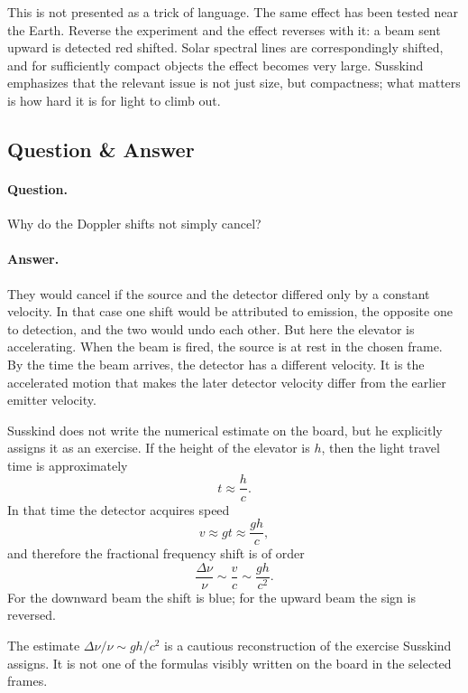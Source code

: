 This is not presented as a trick of language. The same effect has been tested near the Earth. Reverse the experiment and the effect reverses with it: a beam sent upward is detected red shifted. Solar spectral lines are correspondingly shifted, and for sufficiently compact objects the effect becomes very large. Susskind emphasizes that the relevant issue is not just size, but compactness; what matters is how hard it is for light to climb out.

\subsection{Question \& Answer}

\paragraph{Question.} Why do the Doppler shifts not simply cancel?

\paragraph{Answer.} They would cancel if the source and the detector differed only by a constant velocity. In that case one shift would be attributed to emission, the opposite one to detection, and the two would undo each other. But here the elevator is accelerating. When the beam is fired, the source is at rest in the chosen frame. By the time the beam arrives, the detector has a different velocity. It is the accelerated motion that makes the later detector velocity differ from the earlier emitter velocity.

Susskind does not write the numerical estimate on the board, but he explicitly assigns it as an exercise. If the height of the elevator is \(h\), then the light travel time is approximately
\begin{equation}
t \approx \frac{h}{c}.
\end{equation}
In that time the detector acquires speed
\begin{equation}
v \approx gt \approx \frac{gh}{c},
\end{equation}
and therefore the fractional frequency shift is of order
\begin{equation}
\frac{\Delta \nu}{\nu} \sim \frac{v}{c} \sim \frac{gh}{c^{2}}.
\end{equation}
For the downward beam the shift is blue; for the upward beam the sign is reversed.

\begin{remark}
The estimate \(\Delta \nu/\nu \sim gh/c^{2}\) is a cautious reconstruction of the exercise Susskind assigns. It is not one of the formulas visibly written on the board in the selected frames.
\end{remark}


